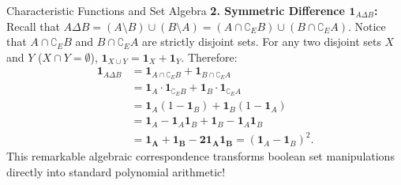 \begin{workedexample}{Characteristic Functions and Set Algebra}
\textbf{2. Symmetric Difference $\mathbf{1}_{A \Delta B}$:}
Recall that $A \Delta B = (A \setminus B) \cup (B \setminus A) = (A \cap \complement_E B) \cup (B \cap \complement_E A)$.
Notice that $A \cap \complement_E B$ and $B \cap \complement_E A$ are strictly disjoint sets.
For any two disjoint sets $X$ and $Y$ ($X \cap Y = \emptyset$), $\mathbf{1}_{X \cup Y} = \mathbf{1}_X + \mathbf{1}_Y$.
Therefore:
\begin{align*}
\mathbf{1}_{A \Delta B} &= \mathbf{1}_{A \cap \complement_E B} + \mathbf{1}_{B \cap \complement_E A} \\
                       &= \mathbf{1}_A \cdot \mathbf{1}_{\complement_E B} + \mathbf{1}_B \cdot \mathbf{1}_{\complement_E A} \\
                       &= \mathbf{1}_A(1 - \mathbf{1}_B) + \mathbf{1}_B(1 - \mathbf{1}_A) \\
                       &= \mathbf{1}_A - \mathbf{1}_A \mathbf{1}_B + \mathbf{1}_B - \mathbf{1}_A \mathbf{1}_B \\
                       &= \mathbf{\mathbf{1}_A + \mathbf{1}_B - 2 \mathbf{1}_A \mathbf{1}_B} = (\mathbf{1}_A - \mathbf{1}_B)^2.
\end{align*}
This remarkable algebraic correspondence transforms boolean set manipulations directly into standard polynomial arithmetic!
\end{workedexample}
